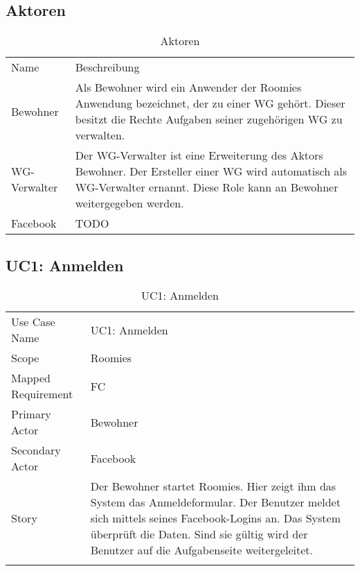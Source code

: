 \subsection{Aktoren}
\begin{table}[H]
	\tablestyle
	\tablealtcolored
	\begin{tabularx}{\textwidth}{lX}
	\tableheadcolor
		\tablehead Name &
		\tablehead Beschreibung \tabularnewline

		\tablebody
			Bewohner &
			Als Bewohner wird ein Anwender der Roomies Anwendung bezeichnet, der zu einer WG gehört. \newline
			Dieser besitzt die Rechte Aufgaben seiner zugehörigen WG zu verwalten.
			\tabularnewline
			WG-Verwalter &
			Der WG-Verwalter ist eine Erweiterung des Aktors Bewohner. Der Ersteller einer WG wird automatisch als WG-Verwalter ernannt. Diese Role kann an Bewohner weitergegeben werden.
			\tabularnewline
			Facebook &
			TODO
	\end{tabularx}
	\caption{Aktoren}
\end{table}

\subsection{UC1: Anmelden}
\begin{table}[H]
	\tablestyle
	\tablealtcolored
	\begin{tabularx}{\textwidth}{lX}
		\tablebody
			Use Case Name &
			UC1: Anmelden
			\tabularnewline
			Scope &
			Roomies
			\tabularnewline
			Mapped Requirement &
			FC
			\tabularnewline
			Primary Actor &
			Bewohner
			\tabularnewline
			Secondary Actor &
			Facebook
			\tabularnewline
			Story &
			Der Bewohner startet Roomies. Hier zeigt ihm das System das Anmeldeformular. Der Benutzer meldet sich mittels seines Facebook-Logins an. Das System überprüft die Daten. Sind sie gültig wird der Benutzer auf die Aufgabenseite weitergeleitet.
			\tabularnewline
		\tableend
	\end{tabularx}
	\caption{UC1: Anmelden}
\end{table}


